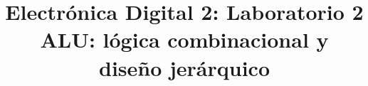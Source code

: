 \documentclass[conference]{IEEEtran}
\begin{document}
\title{Electrónica Digital 2: Laboratorio 2\\
ALU: lógica combinacional y diseño jerárquico}

\maketitle
















\end{document}

